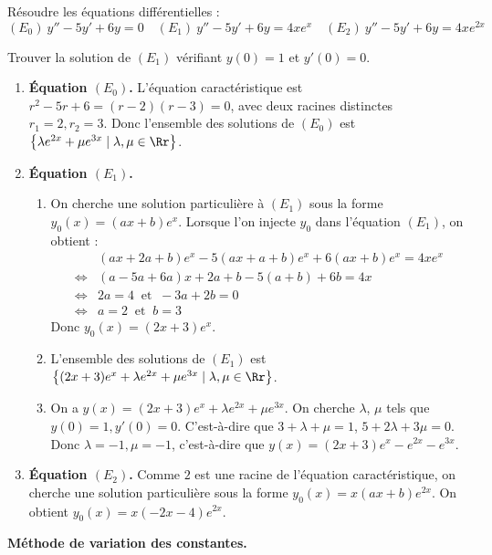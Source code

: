 \documentclass[class=report,crop=false]{standalone}
\begin{document}
\begin{exemple}
Résoudre les équations différentielles :
$$(E_0) \  y''-5y'+6y=0 \quad
(E_1) \  y''-5y'+6y=4xe^x \quad
(E_2) \  y''-5y'+6y=4xe^{2x}$$

Trouver la solution de $(E_1)$ vérifiant $y(0)=1$ et $y'(0)=0$.


\begin{enumerate}
  \item \textbf{Équation $(E_0)$.}
  L'équation caractéristique est $r^2-5r+6=(r-2)(r-3)=0$, avec deux
racines distinctes $r_1=2, r_2=3$.
Donc l'ensemble des solutions de $(E_0)$ est $\big\{\lambda e^{2x}+ \mu e^{3x} \mid
\lambda, \mu \in \Rr\big\}$.



  \item \textbf{Équation $(E_1)$.}
  \begin{enumerate}
    \item On cherche une solution particulière à $(E_1)$ sous la forme
$y_0(x)=(ax+b)e^x$. Lorsque l'on injecte $y_0$ dans l'équation $(E_1)$, on obtient :
$$\begin{array}{rl}
& (ax+2a+b)e^x-5(ax+a+b)e^x+6(ax+b)e^x=4xe^x \\
\iff & (a-5a+6a)x+2a+b-5(a+b)+6b=4x \\
\iff & 2a=4 \ \text{ et }\ -3a+2b=0 \\
\iff & a=2 \ \text{ et }\ b=3
\end{array}$$
 Donc $y_0(x)=(2x+3)e^x$.

    \item L'ensemble des solutions de $(E_1)$ est
$\big\{(2x+3)e^x+\lambda e^{2x} + \mu e^{3x} \mid \lambda,\mu\in \Rr\big\}$.

    \item On a $y(x)=(2x+3)e^x+ \lambda e^{2x} + \mu e^{3x}$. On cherche $\lambda$,
$\mu$ tels que $y(0)=1, y'(0)=0$. C'est-à-dire que
$3+\lambda+\mu=1$, $5+2\lambda+3\mu=0$. Donc $\lambda=-1, \mu=-1$, c'est-à-dire que
$y(x)=(2x+3)e^{x}-e^{2x}-e^{3x}$.
  \end{enumerate}
  \item \textbf{Équation $(E_2)$.}
  Comme $2$ est une racine de l'équation caractéristique, on
  cherche une solution particulière sous la forme $y_0(x)=x(ax+b)e^{2x}$.
  On obtient $y_0(x)=x(-2x-4)e^{2x}$.
\end{enumerate}
\end{exemple}

\bigskip


\textbf{Méthode de variation des constantes.}
\end{document}
